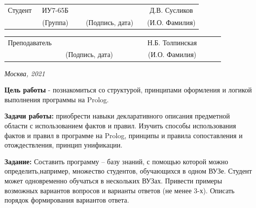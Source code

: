 \documentclass[12pt, a4paper]{extarticle}
\begin{document}
\noindent
{}
\\

\noindent
{}
\\

\vspace{1.5cm}
\noindent
\begin{tabular}{l c c c c c}
	Студент      & ~ИУ7-65Б~               & \hspace{2.5cm} & \hspace{2cm}                 & &  Д.В. Сусликов \\\cline{2-2}\cline{4-4} \cline{6-6} 
	\hspace{3cm} & {\footnotesize(Группа)} &                & {\footnotesize(Подпись, дата)} & & {\footnotesize(И.О. Фамилия)}
\end{tabular}

\noindent
\begin{tabular}{l c c c c}
	Преподаватель & \hspace{5cm}   & \hspace{2cm}                 & & ~~~~~~Н.Б. Толпинская~~~~~~\\\cline{3-3} \cline{5-5} 
	\hspace{3cm}  &                & {\footnotesize(Подпись, дата)} & & {\footnotesize(И.О. Фамилия)}
\end{tabular}

\vspace{0.6cm}
\begin{center}	
	\vfill
	\large \textit {Москва, 2021}
\end{center}

\thispagestyle {empty}
\pagebreak

\clearpage


\textbf{Цель работы} - познакомиться со структурой, принципами оформления и логикой выполнения программы на Prolog.

\textbf{Задачи работы:} приобрести навыки декларативного описания предметной
области с использованием фактов и правил.
Изучить способы использования фактов и правил в программе на Prolog,
принципы и правила сопоставления и отождествления, принцип унификации.

\textbf{Задание:} Составить программу – базу знаний, с помощью которой можно определить,например, множество студентов, обучающихся в одном ВУЗе. Студент может одновременно обучаться в нескольких ВУЗах. Привести примеры возможных
вариантов вопросов и варианты ответов (не менее 3-х). Описать порядок
формирования вариантов ответа.
\end{document}
